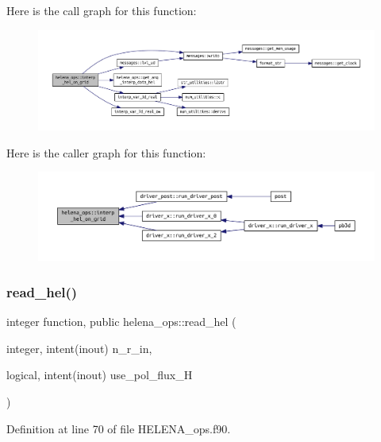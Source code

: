 Here is the call graph for this function\+:
\nopagebreak
\begin{figure}[H]
\begin{center}
\leavevmode
\includegraphics[width=350pt]{namespacehelena__ops_a7796861de18ae7ac9c3aa07a8628be38_cgraph}
\end{center}
\end{figure}
Here is the caller graph for this function\+:
\nopagebreak
\begin{figure}[H]
\begin{center}
\leavevmode
\includegraphics[width=350pt]{namespacehelena__ops_a7796861de18ae7ac9c3aa07a8628be38_icgraph}
\end{center}
\end{figure}
\mbox{\label{namespacehelena__ops_ae05ba1182eb002d93c27ca4ff7ab8cf2}} 
\subsubsection{\texorpdfstring{read\+\_\+hel()}{read\_hel()}}
{\footnotesize\ttfamily integer function, public helena\+\_\+ops\+::read\+\_\+hel (\begin{DoxyParamCaption}\item[{integer, intent(inout)}]{n\+\_\+r\+\_\+in,  }\item[{logical, intent(inout)}]{use\+\_\+pol\+\_\+flux\+\_\+H }\end{DoxyParamCaption})}



Definition at line 70 of file H\+E\+L\+E\+N\+A\+\_\+ops.\+f90.

